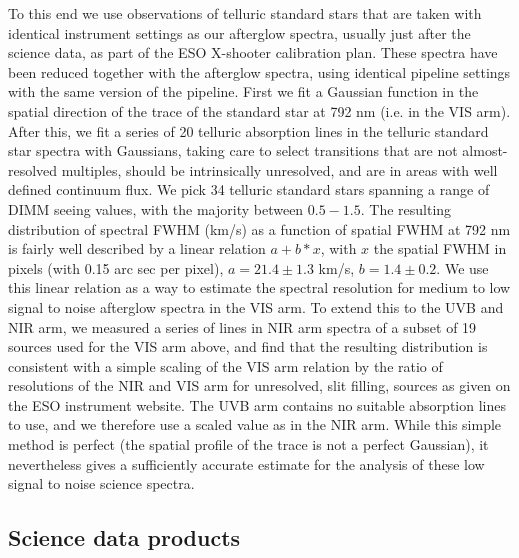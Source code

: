 \documentclass{aa}    %
\begin{document}
To this end we use observations of telluric standard stars that are taken with
identical instrument settings as our afterglow spectra, usually just after the
science data, as part of the ESO X-shooter calibration plan. These spectra have
been reduced together with the afterglow spectra, using identical pipeline
settings with the same version of the pipeline. First we fit a Gaussian function
in the spatial direction of the trace of the standard star at 792 nm (i.e. in
the VIS arm). After this, we fit a series of  20 telluric absorption lines in
the telluric standard star spectra with Gaussians, taking care to select
transitions that are not almost-resolved multiples, should be intrinsically
unresolved, and are in areas with well defined continuum flux. We pick 34
telluric standard stars spanning a range of DIMM seeing values, with the
majority between $0.5-1.5 $\arcsec. The resulting distribution of spectral FWHM
(km/s) as a function of spatial FWHM at 792 nm is fairly well described by a
linear relation $a + b*x$, with $x$ the spatial FWHM in pixels (with 0.15 arc
sec per pixel),  $a= 21.4 \pm 1.3$ km/s, $b=1.4 \pm 0.2$. We use this linear
relation as a way to estimate the spectral resolution for medium to low signal
to noise afterglow spectra in the VIS arm. To extend this to the UVB and NIR
arm, we measured a series of lines in NIR arm spectra of a subset of 19 sources
used for the VIS arm above, and find that the resulting distribution is
consistent with a simple scaling of the VIS arm relation by the ratio of
resolutions of the NIR and VIS arm for unresolved, slit filling, sources as
given on the ESO instrument website. The UVB arm contains no suitable absorption
lines to use, and we therefore use a scaled value as in the NIR arm. While this
simple method is perfect (the spatial profile of the trace is not a perfect
Gaussian), it nevertheless gives a sufficiently accurate estimate for the
analysis of these low signal to noise science spectra.


\subsection{Science data products} \label{products}

\end{document}
